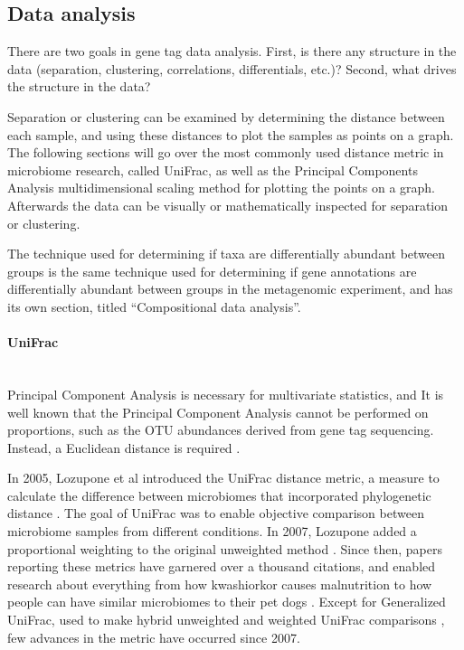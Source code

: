 \FloatBarrier

\subsection{Data analysis}
There are two goals in gene tag data analysis. First, is there any structure in the data (separation, clustering, correlations, differentials, etc.)? Second, what drives the structure in the data?

Separation or clustering can be examined by determining the distance between each sample, and using these distances to plot the samples as points on a graph. The following sections will go over the most commonly used distance metric in microbiome research, called UniFrac, as well as the Principal Components Analysis multidimensional scaling method for plotting the points on a graph. Afterwards the data can be visually or mathematically inspected for separation or clustering.

The technique used for determining if taxa are differentially abundant between groups is the same technique used for determining if gene annotations are differentially abundant between groups in the metagenomic experiment, and has its own section, titled “Compositional data analysis”.

\paragraph{UniFrac}\mbox{}\\
Principal Component Analysis is necessary for multivariate statistics, and It is well known that the Principal Component Analysis cannot be performed on proportions, such as the OTU abundances derived from gene tag sequencing. Instead, a Euclidean distance is required \cite{anderson2003canonical}.

In 2005, Lozupone et al introduced the UniFrac distance metric, a measure to calculate the difference between microbiomes that incorporated phylogenetic distance \cite{lozupone2005unifrac}. The goal of UniFrac was to enable objective comparison between microbiome samples from different conditions. In 2007, Lozupone added a proportional weighting to the original unweighted method \cite{lozupone2007quantitative}. Since then, papers reporting these metrics have garnered over a thousand citations, and enabled research about everything from how kwashiorkor causes malnutrition \cite{smith2013gut} to how people can have similar microbiomes to their pet dogs \cite{song2013cohabiting}.  Except for Generalized UniFrac, used to make hybrid unweighted and weighted UniFrac comparisons \cite{chen2012associating}, few advances in the metric have occurred since 2007. 


